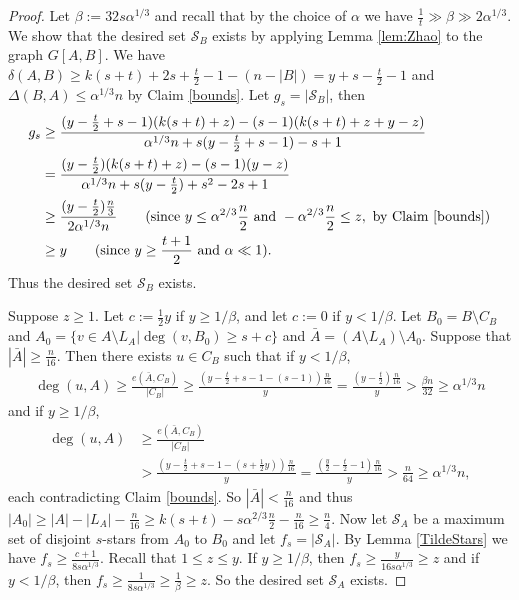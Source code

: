 \documentclass[oneside,12pt]{memoir}
\newcommand{\half}{\frac{1}{2}}
\begin{document}
\begin{proof}
Let $\beta:=32s\alpha^{1/3}$ and recall that by the choice of $\alpha$ we have $\frac{1}{t}\gg \beta\gg 2\alpha^{1/3}$.  
We show that the desired set $\mathcal{S}_B$ exists by applying Lemma \ref{lem:Zhao} to the graph $G[A,B]$.  We have $\delta(A,B)\geq k(s+t)+2s+\frac{t}{2}-1-(n-|B|)=y+s-\frac{t}{2}-1$ and $\Delta(B,A)\leq \alpha^{1/3}n$ by Claim \ref{bounds}.  Let $g_s=|\mathcal{S}_B|$, then
\begin{align*}
g_s&\geq \frac{(y-\frac{t}{2}+s-1)(k(s+t)+z)-(s-1)(k(s+t)+z+y-z)}{\alpha^{1/3}n+s(y-\frac{t}{2}+s-1)-s+1}\\
&=\frac{(y-\frac{t}{2})(k(s+t)+z)-(s-1)(y-z)}{\alpha^{1/3}n+s(y-\frac{t}{2})+s^2-2s+1}\\
&\geq \frac{(y-\frac{t}{2})\frac{n}{3}}{2\alpha^{1/3}n}~~~~~~(\text{since } y\leq \alpha^{2/3}\frac{n}{2} \text{ and } -\alpha^{2/3}\frac{n}{2}\leq z, \text{ by Claim \ref{bounds}} )\\
&\geq y ~~~~~~(\text{since } y\geq \frac{t+1}{2} \text{ and } \alpha\ll 1).
\end{align*}
Thus the desired set $\mathcal{S}_B$ exists.

Suppose $z\geq 1$.  Let $c:=\frac{1}{2}y$ if $y\geq 1/\beta$, and let $c:=0$ if $y<1/\beta$.  Let $B_0=B\setminus C_B$ and $A_0=\{v\in A\setminus L_A|\deg(v,B_0)\geq s+c\}$ and $\bar{A}=(A\setminus L_A)\setminus A_0$.  Suppose that $|\bar{A}|\geq\frac{n}{16}$.  Then there exists $u\in C_B$ such that if $y<1/\beta$,
\begin{align*}
\deg(u,A)\geq\frac{e(\bar{A},C_B)}{|C_B|}\geq\frac{\left(y-\frac{t}{2}+s-1-(s-1)\right)\frac{n}{16}}{y}
=\frac{\left(y-\frac{t}{2}\right)\frac{n}{16}}{y}
> \frac{\beta n}{32}
\geq \alpha^{1/3}n
\end{align*}
and if $y\geq 1/\beta$,
\begin{align*}
\deg(u,A)&\geq\frac{e(\bar{A},C_B)}{|C_B|}\\
&>\frac{\left(y-\frac{t}{2}+s-1-(s+\half y)\right)\frac{n}{16}}{y}
=\frac{\left(\frac{y}{2}-\frac{t}{2}-1\right)\frac{n}{16}}{y}
>\frac{n}{64}
\geq\alpha^{1/3}n,
\end{align*}
each contradicting Claim \ref{bounds}.  So $|\bar{A}|<\frac{n}{16}$ and thus $|A_0|\geq |A|-|L_A|-\frac{n}{16}\geq k(s+t)-s\alpha^{2/3}\frac{n}{2}-\frac{n}{16}\geq\frac{n}{4}$. Now let $\mathcal{S}_A$ be a maximum set of disjoint $s$-stars from $A_0$ to $B_0$ and let $f_s=|\mathcal{S}_A|$. By Lemma \ref{TildeStars} we have $f_s\geq \frac{c+1}{8s\alpha^{1/3}}$.  Recall that $1\leq z\leq y$.  If $y\geq 1/\beta$, then $f_s\geq \frac{y}{16s\alpha^{1/3}}\geq z$ and if $y<1/\beta$, then $f_s\geq \frac{1}{8s\alpha^{1/3}}\geq \frac{1}{\beta}\geq z$.  So the desired set $\mathcal{S}_A$ exists.


\end{proof}
\end{document}
